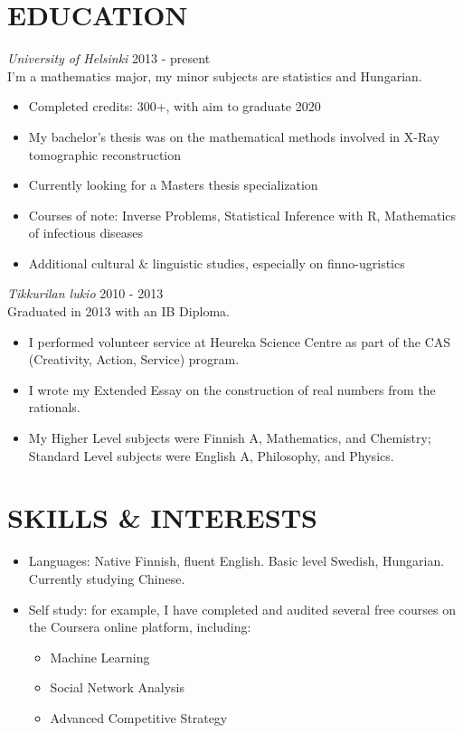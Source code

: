 \documentclass[margin, 10pt]{res} %
\begin{document}
\begin{resume}

\section{EDUCATION}

{\sl University of Helsinki} \hfill 2013 - present\\
I'm a mathematics major, my minor subjects are statistics and Hungarian.
\begin{itemize} \itemsep -2pt
\item Completed credits: 300+, with aim to graduate 2020
\item My bachelor's thesis was on the mathematical methods involved in X-Ray tomographic reconstruction
\item Currently looking for a Masters thesis specialization
\item Courses of note: Inverse Problems, Statistical Inference with R, Mathematics of infectious diseases
\item Additional cultural \& linguistic studies, especially on finno-ugristics
\end{itemize}

\addvspace{-7pt}
{\sl Tikkurilan lukio} \hfill 2010 - 2013\\
Graduated in 2013 with an IB Diploma.
\begin{itemize} \itemsep -2pt
\item I performed volunteer service at Heureka Science Centre as part of the CAS (Creativity, Action, Service) program.
\item I wrote my Extended Essay on the construction of real numbers from the rationals.
\item My Higher Level subjects were Finnish A, Mathematics, and Chemistry; Standard Level subjects were English A, Philosophy, and Physics. 
\end{itemize}

\section{SKILLS \& INTERESTS}
\begin{itemize} \itemsep -2pt
\item Languages: Native Finnish, fluent English. Basic level Swedish, Hungarian. Currently studying Chinese.
\item Self study: for example, I have completed and audited several free courses on the Coursera online platform, including:
  \begin{itemize} \itemsep -2pt
  \item Machine Learning
  \item Social Network Analysis
  \item Advanced Competitive Strategy
  \end{itemize}

\end{itemize}


\end{resume}
\end{document}
